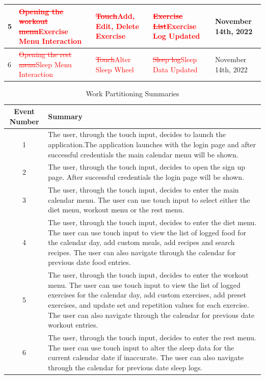 \documentclass[12pt,letterpaper]{article}
\begin{document}
\begin{table}[h!]
\begin{tabularx}{\columnwidth}{|X|X|X|X|X|}
		\hline
		5 & \textcolor{red}{\sout{Opening the workout menu}}\newline \textcolor{red}{Exercise Menu Interaction} & \textcolor{red}{\sout{Touch}}\newline \textcolor{red}{Add, Edit, Delete Exercise} & \textcolor{red}{\sout{Exercise List}}\newline \textcolor{red}{Exercise Log Updated} & November 14th, 2022\\
		\hline
		6 & \textcolor{red}{\sout{Opening the rest menu}}\newline \textcolor{red}{Sleep Menu Interaction} & \textcolor{red}{\sout{Touch}}\newline \textcolor{red}{Alter Sleep Wheel} & \textcolor{red}{\sout{Sleep log}}\newline \textcolor{red}{Sleep Data Updated} &  November 14th, 2022\\
		\hline
	\end{tabularx}
\end{table}

\begin{table}[h]
	\caption{Work Partitioning Summaries}
	\centering
	\begin{tabular}{|c|p{10cm}|}
		\hline
		\textbf{Event Number} & \textbf{Summary} \\
		\hline
		1 & The user, through the touch input, decides to launch the application.The application launches with the login page and after successful credentials the main calendar menu will be shown. \\
		\hline
		2 & The user, through the touch input, decides to open the sign up page. After successful credentials the login page will be shown. \\
		\hline
		3 & The user, through the touch input, decides to enter the main calendar menu. The user can use touch input to select either the diet menu, workout menu or the rest menu. \\
		\hline
		4 & The user, through the touch input, decides to enter the diet menu. The user can use touch input to view the list of logged food for the calendar day, add custom meals, add recipes and search recipes. The user can also navigate through the calendar for previous date food entries. \\
		\hline
		5 & The user, through the touch input, decides to enter the workout menu. The user can use touch input to view the list of logged exercises for the calendar day, add custom exercises, add preset exercises, and update set and repetition values for each exercise. The user can also navigate through the calendar for previous date workout entries. \\
		\hline
		6 & The user, through the touch input, decides to enter the rest menu. The user can use touch input to alter the sleep data for the current calendar date if inaccurate. The user can also navigate through the calendar for previous date sleep logs. \\
		\hline
	\end{tabular}
\end{table}
\end{document}
